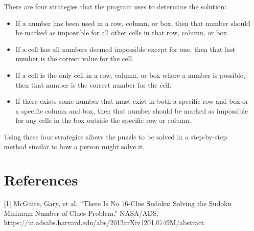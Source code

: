 \documentclass[conference]{IEEEtran}
\begin{document}
There are four strategies that the program uses to determine the solution:
\vspace{1\baselineskip}
\begin{itemize}
    \item{If a number has been used in a row, column, or box, 
    then that number should be marked as impossible for all other cells in that row, column, or box.}

    \item{If a cell has all numbers deemed impossible except for one, 
    then that last number is the correct value for the cell.}

    \item{If a cell is the only cell in a row, column, or box where a number is possible, 
    then that number is the correct number for the cell.}

    \item{If there exists some number that must exist in both a specific row and box or a specific column and box, 
    then that number should be marked as impossible for any cells in the box outside the specific row or column.}
\end{itemize}
Using these four strategies allows the puzzle to be solved in a step-by-step method similar to how a person might solve it.


\section*{References}

\vspace{1\baselineskip}
[1] McGuire, Gary, et al. “There Is No 16-Clue Sudoku: Solving the Sudoku Minimum Number of Clues Problem.” NASA/ADS, https://ui.adsabs.harvard.edu/abs/2012arXiv1201.0749M/abstract. 


\printbibliography
\end{document}
